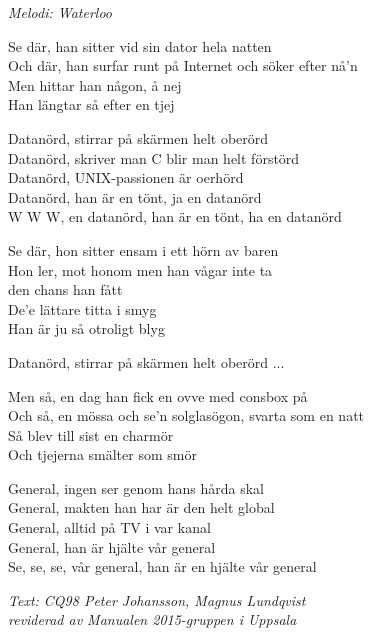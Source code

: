 {\footnotesize\textit{Melodi: Waterloo}}\par
\vspace{10pt}
Se där, han sitter vid sin dator hela natten\\
Och där, han surfar runt på Internet och söker efter nå'n\\
Men hittar han någon, å nej\\
Han längtar så efter en tjej\par
\vspace{10pt}
Datanörd, stirrar på skärmen helt oberörd\\
Datanörd, skriver man C blir man helt förstörd\\
Datanörd, UNIX-passionen är oerhörd\\
Datanörd, han är en tönt, ja en datanörd\\
W W W, en datanörd, han är en tönt, ha en datanörd\par
\newpage
Se där, hon sitter ensam i ett hörn av baren\\
Hon ler, mot honom men han vågar inte ta\\
den chans han fått\\
De'e lättare titta i smyg\\
Han är ju så otroligt blyg\par
\vspace{10pt}
Datanörd, stirrar på skärmen helt oberörd ...\par
\vspace{10pt}
Men så, en dag han fick en ovve med consbox på\\
Och så, en mössa och se'n solglasögon, svarta som en natt\\
Så blev till sist en charmör\\
Och tjejerna smälter som smör\par
\vspace{10pt}
General, ingen ser genom hans hårda skal\\
General, makten han har är den helt global\\
General, alltid på TV i var kanal\\
General, han är hjälte vår general\\
Se, se, se, vår general, han är en hjälte vår general\par
\vspace{10pt}
{\footnotesize\textit{Text: CQ98 Peter Johansson, Magnus Lundqvist \\
					 reviderad av Manualen 2015-gruppen i Uppsala}}
